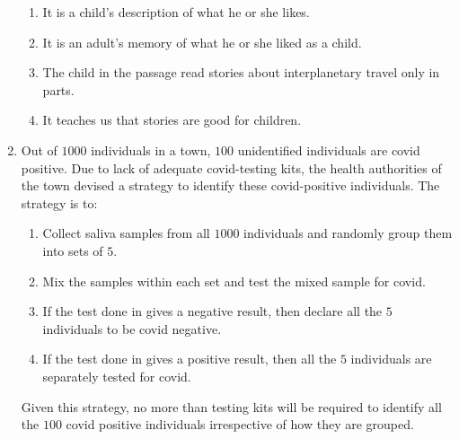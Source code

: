 \documentclass[a4paper, 11pt]{article}
\begin{document}
\begin{enumerate}
    \begin{enumerate}
        \item It is a child's description of what he or she likes.
        \item It is an adult's memory of what he or she liked as a child.
        \item The child in the passage read stories about interplanetary travel only in parts.
        \item It teaches us that stories are good for children.
    \end{enumerate}
    
    \hfill{}
    
    \item Out of $1000$ individuals in a town, $100$ unidentified individuals are covid positive. Due to lack of adequate covid-testing kits, the health authorities of the town devised a strategy to identify these covid-positive individuals. The strategy is to:
    \begin{enumerate}[label=\brak{\roman*}]
        \item Collect saliva samples from all $1000$ individuals and randomly group them into sets of $5$.
        \item Mix the samples within each set and test the mixed sample for covid.
        \item If the test done in  gives a negative result, then declare all the $5$ individuals to be covid negative.
        \item If the test done in  gives a positive result, then all the $5$ individuals are separately tested for covid.
    \end{enumerate}
    Given this strategy, no more than \underline{\hspace{2cm}} testing kits will be required to identify all the $100$ covid positive individuals irrespective of how they are grouped.
    
    \begin{enumerate}
    \end{enumerate}

    \hfill{}
    

\end{enumerate}
\end{document}

